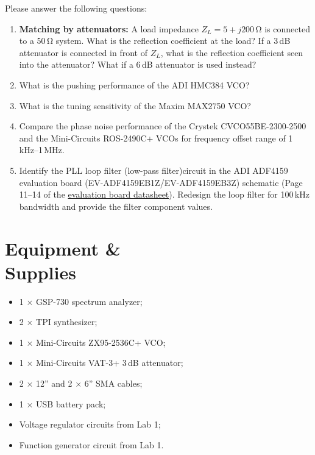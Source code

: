 \documentclass[letterpaper, 11pt]{article}
\begin{document}
Please answer the following questions:
	\begin{enumerate}[itemsep=0.1ex]
		\item \textbf{Matching by attenuators:} A load impedance $Z_L=5 + j200$\,\si{\ohm} is connected to a 50\,\si{\ohm} system. What is the reflection coefficient at the load? If a 3\,dB attenuator is connected in front of $Z_L$, what is the reflection coefficient seen into the attenuator? What if a 6\,dB attenuator is used instead?
		
		\item What is the pushing performance of the ADI HMC384 VCO?
		
		\item What is the tuning sensitivity of the Maxim MAX2750 VCO?
		
		\item Compare the phase noise performance of the Crystek CVCO55BE-2300-2500 and the Mini-Circuits ROS-2490C+ VCOs for frequency offset range of 1\,kHz--1\,MHz. 
		
		\item Identify the PLL loop filter (low-pass filter)circuit in the ADI ADF4159 evaluation board (EV-ADF4159EB1Z/EV-ADF4159EB3Z) schematic (Page 11--14 of the \href{http://www.analog.com/media/en/technical-documentation/user-guides/UG-383.pdf}{evaluation board datasheet}). Redesign the loop filter for 100\,kHz bandwidth and provide the filter component values. 
		
	\end{enumerate}

\section{Equipment \& \\Supplies}

\begin{itemize}[itemsep=0.5ex]
	\item 1 $\times$ GSP-730 spectrum analyzer;
	\item 2 $\times$ TPI synthesizer;
	\item 1 $\times$ Mini-Circuits ZX95-2536C+ VCO;
	\item 1 $\times$ Mini-Circuits VAT-3+ 3\,dB attenuator;
	\item 2 $\times$ 12'' and 2 $\times$ 6'' SMA cables;
	\item 1 $\times$ USB battery pack;
	\item Voltage regulator circuits from Lab 1;
	\item Function generator circuit from Lab 1.
\end{itemize}
\end{document}

